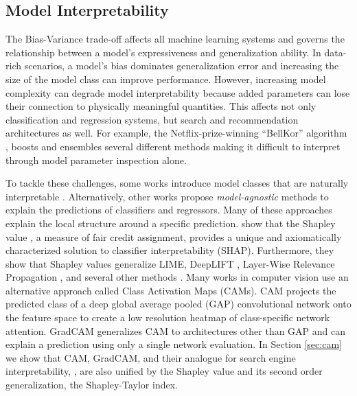\documentclass{article} %
\begin{document}
\vspace{-0.1in}
\subsection{Model Interpretability}
\vspace{-.1in}
The Bias-Variance trade-off \citep{kohavi1996bias} affects all machine learning systems and governs the relationship between a model's expressiveness and generalization ability. In data-rich scenarios, a model's bias dominates generalization error and increasing the size of the model class can improve performance. However, increasing model complexity can degrade model interpretability because added parameters can lose their connection to physically meaningful quantities. This affects not only classification and regression systems, but search and recommendation architectures as well. 
For example, the Netflix-prize-winning ``BellKor'' algorithm \citep{koren2009bellkor}, boosts and ensembles several different methods making it difficult to interpret through model parameter inspection alone.

To tackle these challenges, some works introduce model classes that are naturally interpretable \citep{nori2019interpretml,hastie1990generalized}. Alternatively, other works propose \textit{model-agnostic} methods to explain the predictions of classifiers and regressors. Many of these approaches explain the local structure around a specific prediction. \cite{shap} show that the Shapley value \citep{shapley1951notes}, a measure of fair credit assignment, provides a unique and axiomatically characterized solution to classifier interpretability (SHAP). Furthermore, they show that Shapley values generalize LIME, DeepLIFT \citep{shrikumar2017learning}, Layer-Wise Relevance Propagation \citep{bach2015pixel}, and several other methods \citep{vstrumbelj2014explaining,datta2016algorithmic,lipovetsky2001analysis,saabas_2014}. Many works in computer vision use an alternative approach called Class Activation Maps (CAMs). CAM projects the predicted class of a deep global average pooled (GAP) convolutional network onto the feature space to create a low resolution heatmap of class-specific network attention. GradCAM \citep{gradcam} generalizes CAM to architectures other than GAP and can explain a prediction using only a single network evaluation. In Section \ref{sec:cam} we show that CAM, GradCAM, and their analogue for search engine interpretability, \cite{vedml}, are also unified by the Shapley value and its second order generalization, the Shapley-Taylor index.
\end{document}
